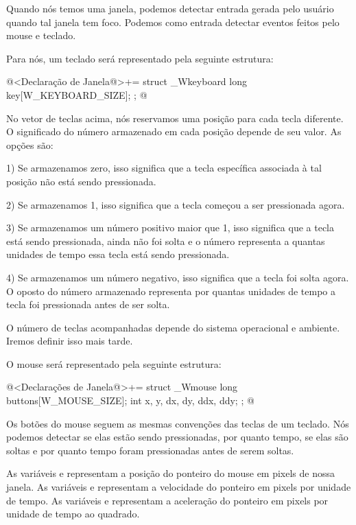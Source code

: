 
Quando nós temos uma janela, podemos detectar entrada gerada pelo
usuário quando tal janela tem foco. Podemos como entrada detectar
eventos feitos pelo mouse e teclado.

Para nós, um teclado será representado pela seguinte estrutura:

\iniciocodigo
@<Declaração de Janela@>+=
struct _Wkeyboard{
  long key[W_KEYBOARD_SIZE];
};
@
\fimcodigo

No vetor de teclas acima, nós reservamos uma posição para cada tecla
diferente. O significado do número armazenado em cada posição depende
de seu valor. As opções são:

1) Se armazenamos zero, isso significa que a tecla específica
associada à tal posição não está sendo pressionada.

2) Se armazenamos 1, isso significa que a tecla começou a ser
pressionada agora.

3) Se armazenamos um número positivo maior que 1, isso significa que a
tecla está sendo pressionada, ainda não foi solta e o número
representa a quantas unidades de tempo essa tecla está sendo
pressionada.

4) Se armazenamos um número negativo, isso significa que a tecla foi
solta agora. O oposto do número armazenado representa por quantas
unidades de tempo a tecla foi pressionada antes de ser solta.

O número de teclas acompanhadas depende do sistema operacional e
ambiente. Iremos definir isso mais tarde.

O mouse será representado pela seguinte estrutura:

\iniciocodigo
@<Declarações de Janela@>+=
struct _Wmouse{
  long buttons[W_MOUSE_SIZE];
  int x, y, dx, dy, ddx, ddy;
};
@
\fimcodigo

Os botões do mouse seguem as mesmas convenções das teclas de um
teclado. Nós podemos detectar se elas estão sendo pressionadas, por
quanto tempo, se elas são soltas e por quanto tempo foram pressionadas
antes de serem soltas.

As variáveis  e  representam a posição do
ponteiro do mouse em pixels de nossa janela. As
variáveis  e  representam a velocidade
do ponteiro em pixels por unidade de tempo. As
variáveis  e  representam a aceleração
do ponteiro em pixels por unidade de tempo ao quadrado.

